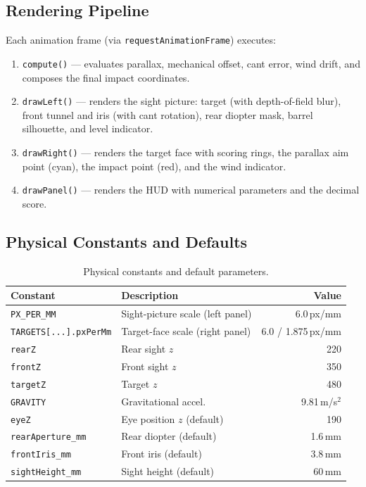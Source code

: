 \documentclass[11pt]{article}
\newcommand{\code}[1]{\texttt{#1}}
\begin{document}
\subsection{Rendering Pipeline}
Each animation frame (via \code{requestAnimationFrame}) executes:
\begin{enumerate}[nosep]
  \item \code{compute()} --- evaluates parallax, mechanical offset,
        cant error, wind drift, and composes the final impact
        coordinates.
  \item \code{drawLeft()} --- renders the sight picture: target
        (with depth-of-field blur), front tunnel and iris (with cant
        rotation), rear diopter mask, barrel silhouette, and level
        indicator.
  \item \code{drawRight()} --- renders the target face with scoring
        rings, the parallax aim point (cyan), the impact point (red),
        and the wind indicator.
  \item \code{drawPanel()} --- renders the HUD with numerical
        parameters and the decimal score.
\end{enumerate}

\subsection{Physical Constants and Defaults}
\begin{table}[H]
\centering\small
\begin{tabular}{@{}llr@{}}
\toprule
\textbf{Constant} & \textbf{Description} & \textbf{Value} \\
\midrule
\code{PX\_PER\_MM}     & Sight-picture scale (left panel) & 6.0\,px/mm \\
\code{TARGETS[...].pxPerMm} & Target-face scale (right panel) & 6.0 / 1.875\,px/mm \\
\code{rearZ}            & Rear sight $z$      & 220 \\
\code{frontZ}           & Front sight $z$     & 350 \\
\code{targetZ}          & Target $z$          & 480 \\
\code{GRAVITY}          & Gravitational accel. & 9.81\,m/s$^2$ \\
\code{eyeZ}             & Eye position $z$ (default) & 190 \\
\code{rearAperture\_mm} & Rear diopter (default)     & 1.6\,mm \\
\code{frontIris\_mm}    & Front iris (default)       & 3.8\,mm \\
\code{sightHeight\_mm}  & Sight height (default)     & 60\,mm \\
\bottomrule
\end{tabular}
\caption{Physical constants and default parameters.}\label{tab:constants}
\end{table}
\end{document}
